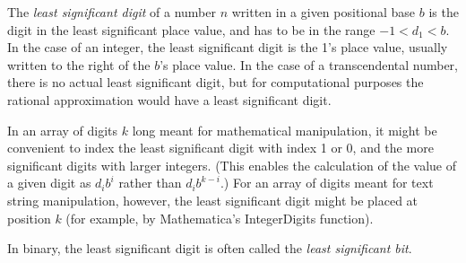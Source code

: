 \documentclass[12pt]{article}
\begin{document}
The {\em least significant digit} of a number $n$ written in a given positional base $b$ is the digit in the least significant place value, and has to be in the range $-1 < d_1 < b$. In the case of an integer, the least significant digit is the 1's place value, usually written to the right of the $b$'s place value. In the case of a transcendental number, there is no actual least significant digit, but for computational purposes the rational approximation would have a least significant digit.

In an array of digits $k$ long meant for mathematical manipulation, it might be convenient to index the least significant digit with index 1 or 0, and the more significant digits with larger integers. (This enables the calculation of the value of a given digit as $d_ib^i$  rather than $d_ib^{k - i}$.) For an array of digits meant for text string manipulation, however, the least significant digit might be placed at position $k$ (for example, by Mathematica's IntegerDigits function).

In binary, the least significant digit is often called the {\em least significant bit}.
\end{document}
